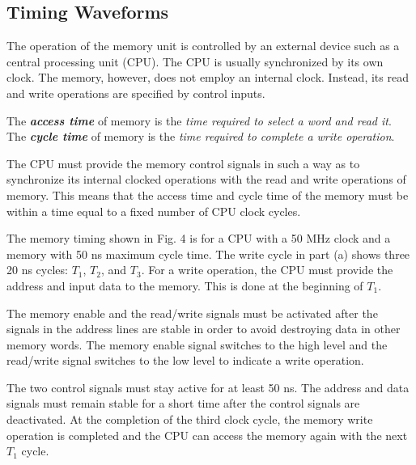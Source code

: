 \subsection{Timing Waveforms}
\label{subsec:timing-waveforms}

The operation of the memory unit is controlled by an external device such as a central processing unit (CPU). The CPU is usually synchronized by its own clock. The memory, however, does not employ an internal clock. Instead, its read and write operations are specified by control inputs.

The \textbf{\textit{access time}} of memory is the \textit{time required to select a word and read it}. The \textit{\textbf{cycle time}} of memory is the \textit{time required to complete a write operation}.

The CPU must provide the memory control signals in such a way as to synchronize its internal clocked operations with the read and write operations of memory. This means that the access time and cycle time of the memory must be within a time equal to a fixed number of CPU clock cycles.

The memory timing shown in Fig. 4 is for a CPU with a 50 MHz clock and a memory with 50 ns maximum cycle time. The write cycle in part (a) shows three 20 ns cycles: $T_1$, $T_2$, and $T_3$. For a write operation, the CPU must provide the address and input data to the memory. This is done at the beginning of $T_1$.

The memory enable and the read/write signals must be activated after the signals in the address lines are stable in order to avoid destroying data in other memory words. The memory enable signal switches to the high level and the read/write signal switches to the low level to indicate a write operation.

The two control signals must stay active for at least 50 ns. The address and data signals must remain stable for a short time after the control signals are deactivated. At the completion of the third clock cycle, the memory write operation is completed and the CPU can access the memory again with the next $T_1$ cycle.

